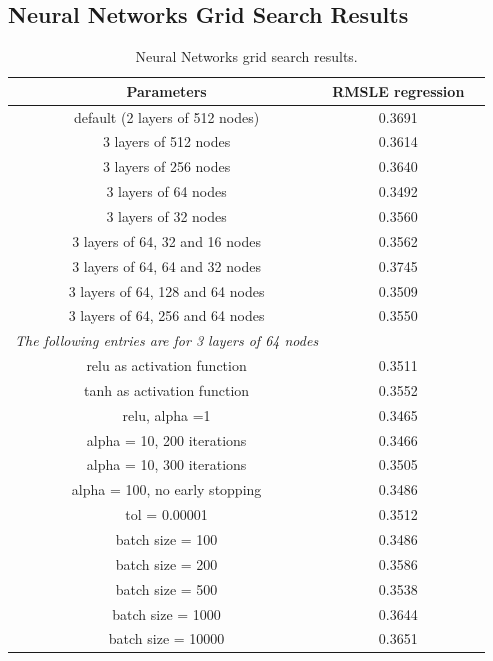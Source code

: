 \documentclass[a4paper]{article}
\begin{document}
\subsection{Neural Networks Grid Search Results}
\begin{table}[H]
    \centering
    \begin{tabular}{ccc}
        Parameters & RMSLE regression\\
        \hline
        default (2 layers of 512 nodes) & 0.3691 \\
        3 layers of 512 nodes & 0.3614 \\
        3 layers of 256 nodes & 0.3640 \\
        3 layers of 64 nodes & 0.3492 \\
        3 layers of 32 nodes & 0.3560 \\
        3 layers of 64, 32 and 16 nodes & 0.3562 \\
        3 layers of 64, 64 and 32 nodes & 0.3745 \\
        3 layers of 64, 128 and 64 nodes & 0.3509 \\
        3 layers of 64, 256 and 64 nodes & 0.3550 \\
        \emph{The following entries are for 3 layers of 64 nodes} \\
        relu as activation function & 0.3511 \\
        tanh as activation function & 0.3552 \\
        relu, alpha =1 & 0.3465 \\
        alpha = 10, 200 iterations & 0.3466 \\
        alpha = 10, 300 iterations & 0.3505 \\
        alpha = 100, no early stopping & 0.3486 \\
        tol = 0.00001 & 0.3512 \\
        batch size = 100 & 0.3486 \\
        batch size = 200 & 0.3586 \\
        batch size = 500 & 0.3538 \\
        batch size = 1000 & 0.3644 \\
        batch size = 10000 & 0.3651 \\
        \hline
    \end{tabular}
    \caption{Neural Networks grid search results.}
    \label{nnet_results}
\end{table}
\end{document}
